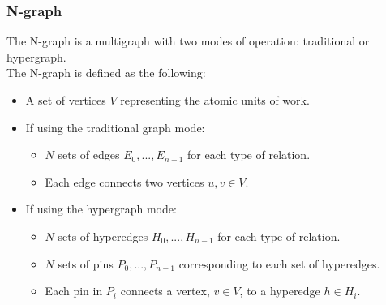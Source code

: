 \documentclass{beamer}
\begin{document}
\begin{frame}
  \frametitle{N-graph}
  The N-graph is a multigraph with two modes of operation: traditional or hypergraph.\\
  \smallskip
  The N-graph is defined as the following:
  \begin{itemize}
  \item A set of vertices $V$ representing the atomic units of work.
  \item If using the traditional graph mode:
    \begin{itemize}
    \item $N$ sets of edges $E_0,...,E_{n-1}$ for each type of relation.
    \item Each edge connects two vertices $u,v \in V$.
    \end{itemize}
  \item If using the hypergraph mode:
    \begin{itemize}
    \item $N$ sets of hyperedges $H_0,...,H_{n-1}$ for each type of relation.
    \item $N$ sets of pins $P_0,...,P_{n-1}$ corresponding to each set of hyperedges.
    \item Each pin in $P_i$ connects a vertex, $v \in V$, to a hyperedge $h \in H_i$.
    \end{itemize}
  \end{itemize}
\end{frame}
\end{document}
